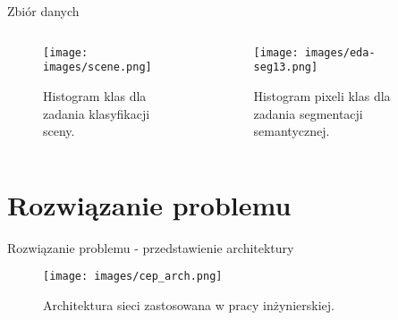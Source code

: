 \documentclass[10pt]{beamer}
\begin{document}
\begin{frame}{Zbiór danych}
    \begin{columns}
        \begin{column}{0.5\textwidth}
            \begin{figure}
                \texttt{[image: images/scene.png]}
                \caption[]{Histogram klas dla zadania klasyfikacji sceny.}
            \end{figure}
            
        \end{column}

        \begin{column}{0.5\textwidth}
            
            \begin{figure}
                \texttt{[image: images/eda-seg13.png]}
                \caption[]{Histogram pixeli klas dla zadania segmentacji semantycznej.}
            \end{figure}
        \end{column}
    \end{columns}
\end{frame}
\section*{Rozwiązanie problemu}
\begin{frame}{Rozwiązanie problemu - przedstawienie architektury}
    \begin{figure}
        \texttt{[image: images/cep\_arch.png]}
        \caption{Architektura sieci zastosowana w pracy inżynierskiej.}
    \end{figure}
\end{frame}
\end{document}
